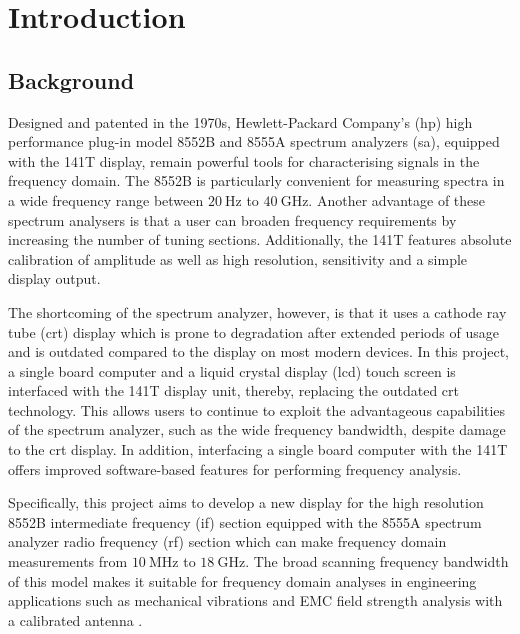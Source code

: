 \documentclass[class=report,11pt,crop=false]{standalone}
\begin{document}
\chapter{Introduction \label{ch:intro}}

\section{Background}
Designed and patented in the 1970s, Hewlett-Packard Company's (\acrshort{hp}) high performance plug-in model 8552B and 8555A spectrum analyzers (\acrshort{sa}), equipped with the 141T display, remain powerful tools for characterising signals in the frequency domain. The 8552B is particularly convenient for measuring spectra in a wide frequency range between $\SI{20}{\hertz}$ to $\SI{40}{\giga\hertz}$. Another advantage of these spectrum analysers is that a user can broaden frequency requirements by increasing the number of tuning sections. Additionally, the 141T features absolute calibration of amplitude as well as high resolution, sensitivity and a simple display output.  

The shortcoming of the spectrum analyzer, however, is that it uses a cathode ray tube (\acrshort{crt}) display which is prone to degradation after extended periods of usage and is outdated compared to the display on most modern devices. In this project, a single board computer and a liquid crystal display (\acrshort{lcd}) touch screen is interfaced with the 141T display unit, thereby, replacing the outdated \acrshort{crt} technology. This allows users to continue to exploit the advantageous capabilities of the spectrum analyzer, such as the wide frequency bandwidth, despite damage to the \acrshort{crt} display. In addition, interfacing a single board computer with the 141T offers improved software-based features for performing frequency analysis.

Specifically, this project aims to develop a new display for the high resolution 8552B intermediate frequency (\acrshort{if}) section equipped with the 8555A spectrum analyzer radio frequency (\acrshort{rf}) section which can make frequency domain measurements from $\SI{10}{\mega\hertz}$ to $\SI{18}{\giga\hertz}$. The broad scanning frequency bandwidth of this model makes it suitable for frequency domain analyses in engineering applications such as mechanical vibrations and EMC field strength analysis with a calibrated antenna \cite{HPsiganalyzers}. 
\end{document}
